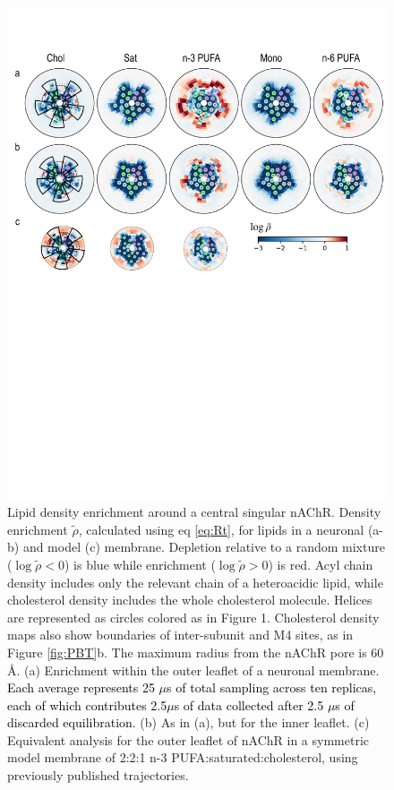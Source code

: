 \documentclass[%
 aip,
 amsmath,amssymb,
 preprint,%
]{revtex4-1}\usepackage{setspace}
\newcommand{\grace}[1]{\textcolor{black}{{#1}}}
\newcommand{\nachr}{nAChR}
\begin{document}
\begin{figure}[!h]
	\center
	\includegraphics[width=\linewidth]{acyl_heatmap.pdf}
	\caption{{Lipid density enrichment around a central singular \nachr.} Density enrichment $\tilde{\rho}$, calculated using eq \ref{eq:Rt}, for lipids in a neuronal (a-b) and model (c) membrane.  Depletion relative to a random mixture ($\log\tilde{\rho}< 0$) is blue while enrichment ($\log\tilde{\rho}> 0$) is red. Acyl chain density includes only the relevant chain of a heteroacidic lipid, while cholesterol density includes the whole cholesterol molecule.  Helices are represented as circles colored as in Figure 1. Cholesterol density maps also show boundaries of inter-subunit and M4 sites, as in Figure \ref{fig:PBT}b. The maximum radius from the \nachr{} pore is 60 \AA. (a) Enrichment within the outer leaflet of a neuronal membrane. \grace{Each average represents 25 $\mu$s of total sampling across ten replicas, each of which contributes 2.5$\mu$s of data collected after 2.5 $\mu$s of discarded equilibration.} (b) As in (a), but for the inner leaflet. (c) Equivalent analysis for the outer leaflet of \nachr{} in a symmetric model membrane of 2:2:1 n-3 PUFA:saturated:cholesterol, using previously published trajectories\cite{Woods2019}.} 
	\label{fig:acyl_map}
\end{figure}
\end{document}
